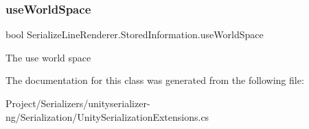 \subsubsection{\texorpdfstring{use\+World\+Space}{useWorldSpace}}
{\footnotesize\ttfamily bool Serialize\+Line\+Renderer.\+Stored\+Information.\+use\+World\+Space}



The use world space 



The documentation for this class was generated from the following file\+:\begin{DoxyCompactItemize}
\item 
Project/\+Serializers/unityserializer-\/ng/\+Serialization/Unity\+Serialization\+Extensions.\+cs\end{DoxyCompactItemize}
